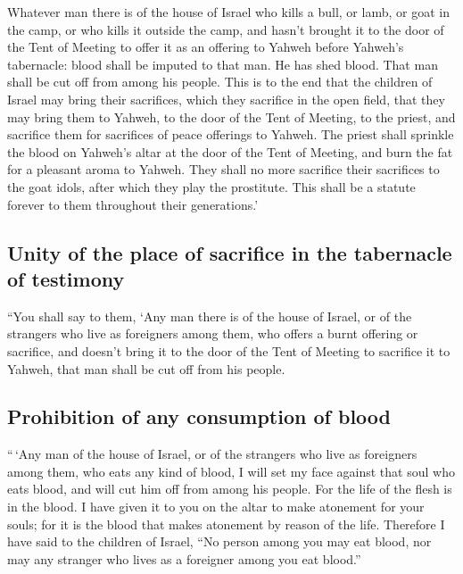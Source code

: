  Whatever man there is of the house of Israel who kills a
bull, or lamb, or goat in the camp, or who kills it outside the camp,
 and hasn't brought it to the door of the Tent of Meeting
to offer it as an offering to Yahweh before Yahweh's tabernacle: blood
shall be imputed to that man. He has shed blood. That man shall be cut
off from among his people.  This is to the end that the
children of Israel may bring their sacrifices, which they sacrifice in
the open field, that they may bring them to Yahweh, to the door of the
Tent of Meeting, to the priest, and sacrifice them for sacrifices of
peace offerings to Yahweh.  The priest shall sprinkle the
blood on Yahweh's altar at the door of the Tent of Meeting, and burn the
fat for a pleasant aroma to Yahweh.  They shall no more
sacrifice their sacrifices to the goat idols, after which they play the
prostitute. This shall be a statute forever to them throughout their
generations.'

\hypertarget{unity-of-the-place-of-sacrifice-in-the-tabernacle-of-testimony}{%
\subsection{Unity of the place of sacrifice in the tabernacle of
testimony}\label{unity-of-the-place-of-sacrifice-in-the-tabernacle-of-testimony}}

 ``You shall say to them, `Any man there is of the house
of Israel, or of the strangers who live as foreigners among them, who
offers a burnt offering or sacrifice,  and doesn't bring
it to the door of the Tent of Meeting to sacrifice it to Yahweh, that
man shall be cut off from his people.

\hypertarget{prohibition-of-any-consumption-of-blood}{%
\subsection{Prohibition of any consumption of
blood}\label{prohibition-of-any-consumption-of-blood}}

 ``\,`Any man of the house of Israel, or of the strangers
who live as foreigners among them, who eats any kind of blood, I will
set my face against that soul who eats blood, and will cut him off from
among his people.  For the life of the flesh is in the
blood. I have given it to you on the altar to make atonement for your
souls; for it is the blood that makes atonement by reason of the life.
 Therefore I have said to the children of Israel, ``No
person among you may eat blood, nor may any stranger who lives as a
foreigner among you eat blood.''

